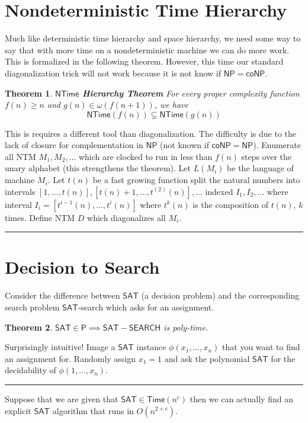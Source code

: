 \documentclass[twoside]{article}
\newcounter{lecnum}
\newtheorem{theorem}{Theorem}[lecnum]
\newenvironment{proof}{{\bf Proof:}}{\hfill\rule{2mm}{2mm}}
\def\P{\mathsf{P}}
\def\NP{\mathsf{NP}}
\def\coNP{\mathsf{coNP}}
\def\Time{\mathsf{Time}}
\def\SAT{\mathsf{SAT}}
\def\NTime{\mathsf{NTime}}
\begin{document}
\section{Nondeterministic Time Hierarchy}
Much like deterministic time hierarchy and space hierarchy, we need some way to say that with more time on a nondeterministic machine we can do more work. This is formalized in the following theorem. However, this time our standard diagonalization trick will not work because it is not know if $\NP = \coNP$.

\begin{theorem}
\textbf{$\NTime$ Hierarchy Theorem} For every proper complexity function $f(n) \geq n$ and $g(n) \in \omega(f(n+1))$, we have
\[\NTime (f(n)) \subsetneq \NTime (g(n))\]
\end{theorem} 
\begin{proof}
This is requires a different tool than diagonalization. The difficulty is due to the lack of closure for complementation in $\NP$ (not known if $\coNP = \NP$). Enumerate all NTM $M_1, M_2, ...$ which are clocked to run in less than $f(n)$ steps over the unary alphabet (this strengthens the theorem). Let $L(M_i)$ be the language of machine $M_i$. Let $t(n)$ be a fast growing function split the natural numbers into intervals $[1, ..., t(n)], [t(n) + 1, ..., t^{(2)}(n)], ...$ indexed $I_1, I_2, ...$ where interval $I_i = [t^{i-1}(n), ..., t^{i}(n)]$ where $t^{k}(n)$ is the composition of $t(n)$, $k$ times. Define NTM $D$ which diagonalizes all $M_i$.  
\end{proof}

\section{Decision to Search}
Consider the difference between $\SAT$ (a decision problem) and the corresponding search problem $\SAT$-search which asks for an assignment. 

\begin{theorem}
$\SAT \in \P \implies \mathsf{SAT-SEARCH}$ is poly-time.
\end{theorem}
\begin{proof}
Surprisingly intuitive! Image a $\SAT$ instance $\phi(x_1, ..., x_n)$ that you want to find an assignment for. Randomly assign $x_1 = 1$ and ask the polynomial $\SAT$ for the decidability of $\phi(1, ..., x_n)$.
\end{proof}

Suppose that we are given that $\SAT \in \Time (n^c)$ then we can actually find an explicit $\SAT$ algorithm that runs in $O(n^{2+c})$.
\end{document}
